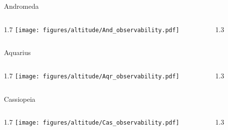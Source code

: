 \documentclass[final]{beamer}
\newlength{\colwidth}
\begin{document}
\begin{frame}[t]{}
  \Large{Andromeda}
  \begin{columns}[T]
    \begin{column}{1.7\colwidth}
      \centering
      \texttt{[image: figures/altitude/And\_observability.pdf]}
    \end{column}
    \begin{column}{1.3\colwidth}
      \Large
      
    \end{column}
  \end{columns}

  \Large{Aquarius}
  \begin{columns}[T]
    \begin{column}{1.7\colwidth}
      \centering
      \texttt{[image: figures/altitude/Aqr\_observability.pdf]}
    \end{column}
    \begin{column}{1.3\colwidth}
      \Large
      
    \end{column}
  \end{columns}

  \Large{Cassiopeia}
  \begin{columns}[T]
    \begin{column}{1.7\colwidth}
      \centering
      \texttt{[image: figures/altitude/Cas\_observability.pdf]}
    \end{column}
    \begin{column}{1.3\colwidth}
      \Large
      
    \end{column}
  \end{columns}
\end{frame}

\end{document}
